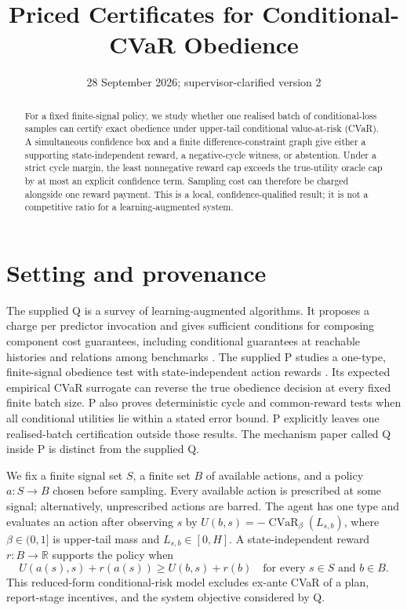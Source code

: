 \documentclass{article}
\title{Priced Certificates for Conditional-CVaR Obedience}
\date{28 September 2026; supervisor-clarified version 2}
\begin{document}
\maketitle

\begin{abstract}
For a fixed finite-signal policy, we study whether one realised batch of
conditional-loss samples can certify exact obedience under upper-tail
conditional value-at-risk (CVaR). A simultaneous confidence box and a
finite difference-constraint graph give either a supporting state-independent
reward, a negative-cycle witness, or abstention. Under a strict cycle margin,
the least nonnegative reward cap exceeds the true-utility oracle cap by at
most an explicit confidence term. Sampling cost can therefore be charged
alongside one reward payment. This is a local, confidence-qualified result;
it is not a competitive ratio for a learning-augmented system.
\end{abstract}

\section{Setting and provenance}

The supplied Q is a survey of learning-augmented algorithms. It proposes a
charge per predictor invocation and gives sufficient conditions for composing
component cost guarantees, including conditional guarantees at reachable
histories and relations among benchmarks \cite{zhao2026survey}. The supplied
P studies a one-type, finite-signal obedience test with state-independent
action rewards \cite{pathfinder2026reversal}. Its expected empirical CVaR
surrogate can reverse the true obedience decision at every fixed finite batch
size. P also proves deterministic cycle and common-reward tests when all
conditional utilities lie within a stated error bound. P explicitly leaves
one realised-batch certification outside those results. The mechanism paper
called Q inside P is distinct from the supplied Q.

We fix a finite signal set \(S\), a finite set \(B\) of available actions,
and a policy \(a:S\to B\) chosen before sampling. Every available action is
prescribed at some signal; alternatively, unprescribed actions are barred.
The agent has one type and evaluates an action after observing \(s\) by
\(U(b,s)=-\operatorname{CVaR}_{\beta}(L_{s,b})\), where
\(\beta\in(0,1]\) is upper-tail mass and \(L_{s,b}\in[0,H]\).
A state-independent reward \(r:B\to\mathbb R\) supports the policy when
\[
U(a(s),s)+r(a(s))\geq U(b,s)+r(b)
\quad\text{for every }s\in S\text{ and }b\in B.
\]
This reduced-form conditional-risk model excludes ex-ante CVaR of a plan,
report-stage incentives, and the system objective considered by Q.
\end{document}
